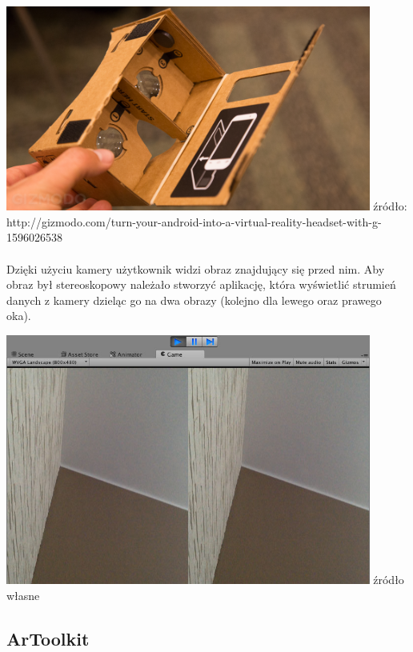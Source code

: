 \documentclass[12pt]{article}
\begin{document}
{{\begin{center}
\includegraphics[width=0.9\textwidth]{images/cardboard.jpg}
\small {źródło: http://gizmodo.com/turn-your-android-into-a-virtual-reality-headset-with-g-1596026538 }
\end{center}

\paragraph{}
Dzięki użyciu kamery użytkownik widzi obraz znajdujący się przed nim. Aby obraz był stereoskopowy należało stworzyć aplikację, która wyświetlić strumień danych z kamery dzieląc go na dwa obrazy (kolejno dla lewego oraz prawego oka).

\begin{center}
\includegraphics[width=0.9\textwidth]{images/kadr.jpg}
\small {źródło własne}
\end{center}

\subsection{ArToolkit}
}}
\end{document}
